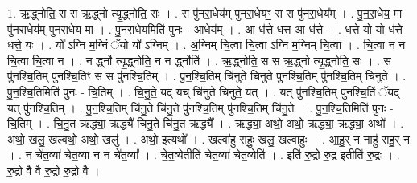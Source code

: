 \documentclass[17pt]{extarticle}
\begin{document}
1. ऋ॒द्ध्नोति॒ स स ऋ॒द्ध्नो त्यृ॒द्ध्नोति॒ सः । . स पु॑नरा॒धेय॑म् पुनरा॒धेयꣳ॒॒ स स पु॑नरा॒धेय᳚म् । . पु॒न॒रा॒धेय॒ मा पु॑नरा॒धेय॑म् पुनरा॒धेय॒ मा । . पु॒न॒रा॒धेय॒मिति॑ पुनः - आ॒धेय᳚म् । . आ ध॑त्ते धत्त॒ आ ध॑त्ते । . ध॒त्ते॒ यो यो ध॑त्ते धत्ते॒ यः । . यो᳚ ऽग्नि म॒ग्निं ॅयो यो᳚ ऽग्निम् । . अ॒ग्निम् चि॒त्वा चि॒त्वा ऽग्नि म॒ग्निम् चि॒त्वा । . चि॒त्वा न न चि॒त्वा चि॒त्वा न । . न र्द्ध्नो त्यृ॒द्ध्नोति॒ न न र्द्ध्नोति॑ । . ऋ॒द्ध्नोति॒ स स ऋ॒द्ध्नो त्यृ॒द्ध्नोति॒ सः । . स पु॑नश्चि॒तिम् पु॑नश्चि॒तिꣳ स स पु॑नश्चि॒तिम् । . पु॒न॒श्चि॒तिम् चि॑नुते चिनुते पुनश्चि॒तिम् पु॑नश्चि॒तिम् चि॑नुते । . पु॒न॒श्चि॒तिमिति॑ पुनः - चि॒तिम् । . चि॒नु॒ते॒ यद् यच् चि॑नुते चिनुते॒ यत् । . यत् पु॑नश्चि॒तिम् पु॑नश्चि॒तिं ॅयद् यत् पु॑नश्चि॒तिम् । . पु॒न॒श्चि॒तिम् चि॑नु॒ते चि॑नु॒ते पु॑नश्चि॒तिम् पु॑नश्चि॒तिम् चि॑नु॒ते । . पु॒न॒श्चि॒तिमिति॑ पुनः - चि॒तिम् । . चि॒नु॒त ऋद्ध्या॒ ऋद्ध्यै॑ चिनु॒ते चि॑नु॒त ऋद्ध्यै᳚ । . ऋद्ध्या॒ अथो॒ अथो॒ ऋद्ध्या॒ ऋद्ध्या॒ अथो᳚ । . अथो॒ खलु॒ खल्वथो॒ अथो॒ खलु॑ । . अथो॒ इत्यथो᳚ । . खल्वा॑हु राहुः॒ खलु॒ खल्वा॑हुः । . आ॒हु॒र् न नाहु॑ राहु॒र् न । . न चे॑त॒व्या॑ चेत॒व्या॑ न न चे॑त॒व्या᳚ । . चे॒त॒व्येतीति॑ चेत॒व्या॑ चेत॒व्येति॑ । . इति॑ रु॒द्रो रु॒द्र इतीति॑ रु॒द्रः । . रु॒द्रो वै वै रु॒द्रो रु॒द्रो वै । \newline
\end{document}
